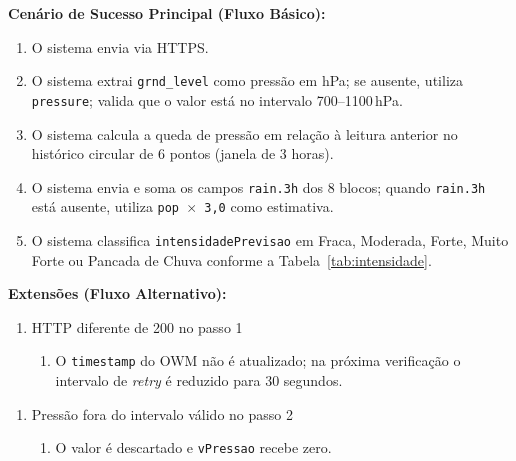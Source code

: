 \textbf{Cenário de Sucesso Principal (Fluxo Básico):}
\begin{enumerate}
  \item O sistema envia  via HTTPS.
  \item O sistema extrai \texttt{grnd\_level} como pressão
        em hPa; se ausente, utiliza \texttt{pressure}; valida
        que o valor está no intervalo 700--1100\,hPa.
  \item O sistema calcula a queda de pressão em relação à
        leitura anterior no histórico circular de 6 pontos
        (janela de 3 horas).
  \item O sistema envia  e
        soma os campos \texttt{rain.3h} dos 8 blocos; quando
        \texttt{rain.3h} está ausente, utiliza
        \texttt{pop $\times$ 3{,}0} como estimativa.
  \item O sistema classifica \texttt{intensidadePrevisao} em
        Fraca, Moderada, Forte, Muito Forte ou Pancada de
        Chuva conforme a Tabela~\ref{tab:intensidade}.
\end{enumerate}

\textbf{Extensões (Fluxo Alternativo):}

\begin{enumerate}
  \renewcommand{\theenumi}{1a}
  \renewcommand{\labelenumi}{\theenumi.}
  \item HTTP diferente de 200 no passo 1
  \begin{enumerate}
  \item O \texttt{timestamp} do OWM não é atualizado;
        na próxima verificação o intervalo de \textit{retry}
        é reduzido para 30 segundos.
  \end{enumerate}
\end{enumerate}

\begin{enumerate}
  \renewcommand{\theenumi}{2a}
  \renewcommand{\labelenumi}{\theenumi.}
  \item Pressão fora do intervalo válido no passo 2
  \begin{enumerate}
  \item O valor é descartado e \texttt{vPressao} recebe zero.
  \end{enumerate}
\end{enumerate}

